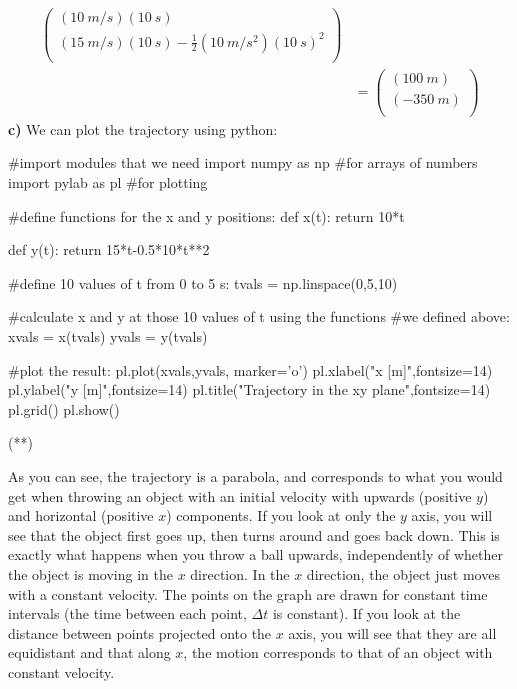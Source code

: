 \begin{example}
\begin{align*}
\begin{pmatrix}
           (\SI{10}{m/s})(\SI{10}{s}) \\
           (\SI{15}{m/s})(\SI{10}{s})-\frac{1}{2}(\SI{10}{m/s^2})(\SI{10}{s})^2 \\
         \end{pmatrix}\\
         &= \begin{pmatrix}
           (\SI{100}{m}) \\
           (\SI{-350}{m})\\
         \end{pmatrix}
\end{align*}
\textbf{c)} We can plot the trajectory using python:

\begin{python}[caption=Trajectory in xy plane]
#import modules that we need
import numpy as np #for arrays of numbers
import pylab as pl #for plotting

#define functions for the x and y positions:
def x(t):
    return 10*t

def y(t):
    return 15*t-0.5*10*t**2

#define 10 values of t from 0 to 5 s:
tvals = np.linspace(0,5,10)

#calculate x and y at those 10 values of t using the functions
#we defined above:
xvals = x(tvals)
yvals = y(tvals)

#plot the result:
pl.plot(xvals,yvals, marker='o')
pl.xlabel("x [m]",fontsize=14)
pl.ylabel("y [m]",fontsize=14)
pl.title("Trajectory in the xy plane",fontsize=14)
pl.grid()
pl.show()
\end{python}
\begin{poutput}
(**)
\end{poutput}
As you can see, the trajectory is a parabola, and corresponds to what you would get when throwing an object with an initial velocity with upwards (positive $y$) and horizontal (positive $x$) components. If you look at only the $y$ axis, you will see that the object first goes up, then turns around and goes back down. This is exactly what happens when you throw a ball upwards, independently of whether the object is moving in the $x$ direction. In the $x$ direction, the object just moves with a constant velocity. The points on the graph are drawn for constant time intervals (the time between each point, $\Delta t$ is constant). If you look at the distance between points projected onto the $x$ axis, you will see that they are all equidistant and that along $x$, the motion corresponds to that of an object with constant velocity. 
\end{example}

